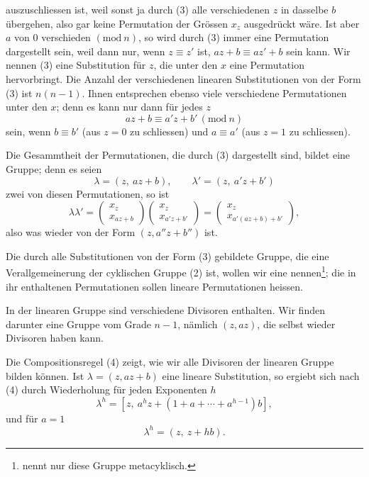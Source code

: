 auszuschliessen ist, weil sonst ja durch (3) alle verschiedenen $z$ in dasselbe $b$
übergehen, also gar keine Permutation der Grössen $x_z$ ausgedrückt wäre. Ist aber $a$
von 0 verschieden $(\mathrm{mod}\ n)$, so wird durch (3) immer eine Permutation
dargestellt sein, weil dann nur, wenn $z \equiv z'$ ist, $az+b \equiv az'+b$ sein kann.
Wir nennen (3) eine Substitution für $z$, die unter den $x$ eine Permutation
hervorbringt. Die Anzahl der verschiedenen linearen Substitutionen von der Form (3)
ist $n(n-1)$. Ihnen entsprechen ebenso viele verschiedene Permutationen unter den $x$;
denn es kann nur dann für jedes $z$
\[ az + b \equiv a'z + b' \, (\mathrm{mod}\ n) \]
sein, wenn $b \equiv b'$ (aus $z = 0$ zu schliessen) und $a \equiv a'$ (aus $z = 1$ zu
schliessen).

Die Gesammtheit der Permutationen, die durch (3) dargestellt sind, bildet eine Gruppe;
denn es seien
\[ \lambda = (z,\ az+b), \qquad \lambda' = (z,\ a'z+b') \]
zwei von diesen Permutationen, so ist
\[
\lambda \lambda' =
\begin{pmatrix} x_z \\ x_{az+b} \end{pmatrix}
\begin{pmatrix} x_z \\ x_{a'z+b'} \end{pmatrix}
=
\begin{pmatrix} x_z \\ x_{a'(az+b)+b'} \end{pmatrix},
\]
also
was wieder von der Form $(z, a''z+b'')$ ist.

Die durch alle Substitutionen von der Form (3) gebildete Gruppe, die eine
Verallgemeinerung der cyklischen Gruppe (2) ist, wollen wir eine
 nennen\footnote{ nennt nur diese Gruppe
metacyklisch.}; die in ihr enthaltenen Permutationen sollen
lineare Permutationen heissen.

In der linearen Gruppe sind verschiedene Divisoren enthalten. Wir finden darunter eine
Gruppe vom Grade $n-1$, nämlich $(z, az)$, die selbst wieder Divisoren haben kann.

Die Compositionsregel (4) zeigt, wie wir alle Divisoren der linearen Gruppe bilden
können. Ist $\lambda = (z, az+b)$ eine lineare Substitution, so ergiebt sich nach (4)
durch Wiederholung für jeden Exponenten $h$
\[ \lambda^h = [z,\ a^h z + (1 + a + \cdots + a^{h-1})b], \]
und für $a = 1$
\[ \lambda^h = (z,\ z + hb). \]
